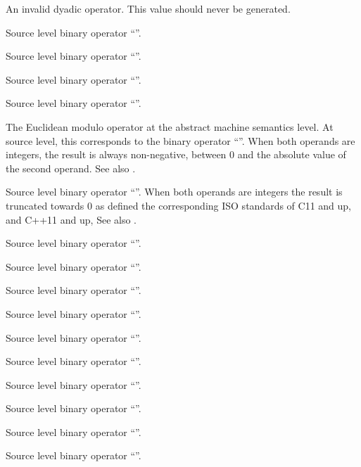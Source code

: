 An invalid dyadic operator.  This value should never be generated.

Source level binary operator ``\code{+}''.

Source level binary operator ``\code{-}''.

Source level binary operator ``\code{*}''.

Source level binary operator ``\code{/}''.

The Euclidean modulo operator at the abstract machine semantics level.
At source level, this corresponds to the binary operator ``\code{\%}''.
When both operands are integers, the result is always non-negative, between $0$ and the absolute value of the second operand.
See also .

Source level binary operator ``\code{\%}''. 
When both operands are integers the result is truncated towards 0 as defined the corresponding ISO standards of C11 and up, and C++11 and up, 
See also .

Source level binary operator ``\code{\&}''.

Source level binary operator ``\code{|}''.

Source level binary operator ``\code{\^}''.

Source level binary operator ``\code{<<}''.

Source level binary operator ``\code{>>}''.

Source level binary operator ``\code{==}''.

Source level binary operator ``\code{!=}''.

Source level binary operator ``\code{<}''.

Source level binary operator ``\code{<=}''.

Source level binary operator ``\code{>}''.

